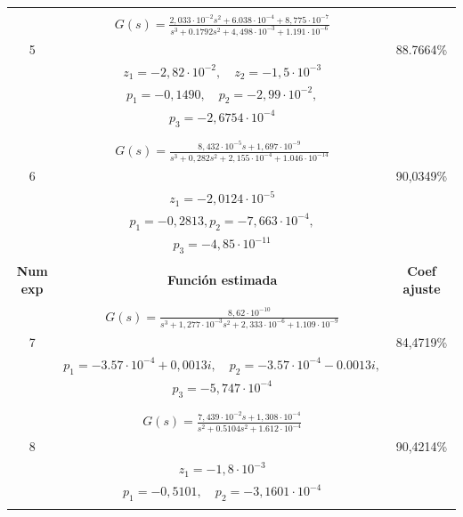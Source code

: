 \begin{longtable}{| c | c | c |}
\hline
     &  &   \\
     &  \Large$ G(s) = \frac{2,033 \cdot 10^{-2}s^{2}+ 6.038 \cdot 10^{-4} + 8,775 \cdot 10^{-7}}{ s^{3} + 0.1792s^{2} + 4,498\cdot 10^{-3} + 1.191 \cdot 10^{-6}} $ &  \\
  5 &  & 88.7664\%  \\
     &  $ z_{1} = -2,82 \cdot 10^{-2},\quad z_{2} = -1,5 \cdot 10^{-3} $ &   \\
     &  $ p_{1} = -0,1490,\quad p_{2} = -2,99 \cdot 10^{-2}, $ &  \\
     &  $ p_{3} = -2,6754 \cdot 10^{-4} $ & \\
     &  &   \\
\hline
     &  &   \\
     &  \Large$ G(s) = \frac{8,432 \cdot 10^{-5}s + 1,697 \cdot 10^{-9}}{ s^{3} + 0,282s^{2} + 2,155\cdot 10^{-4} + 1.046 \cdot 10^{-14}} $ &  \\
  6 &  & 90,0349\%  \\
     &  $ z_{1} = -2,0124 \cdot 10^{-5}$ &   \\
     &  $ p_{1} = -0,2813,  p_{2} = -7,663\cdot 10^{-4}, $ &  \\
     &  $ p_{3} = -4,85 \cdot 10^{-11} $ & \\
     &  &   \\
\hline
\newpage
\hline
\textbf{Num exp} & \textbf{Función estimada} & \textbf{Coef ajuste} \\
\hline
     &  &   \\
     &  \large$ G(s) = \frac{8,62\cdot 10^{-10}}{ s^{3} + 1,277 \cdot 10^{-3}s^{2} + 2,333\cdot 10^{-6} + 1.109 \cdot 10^{-9}} $ & \\
  7 &  & 84,4719\%  \\
     &  $ p_{1} = - 3.57\cdot 10^{-4} + 0,0013i,\quad p_{2} = -3.57\cdot 10^{-4}  - 0.0013i, $ &  \\
     &  $ p_{3}=- 5,747 \cdot 10^{-4} $ &   \\
     &  & \\
\hline
     &  &   \\
     &  \large$ G(s) = \frac{7,439 \cdot 10^{-2}s + 1,308 \cdot 10^{-4}}{ s^{2} + 0.5104s^{2} + 1.612\cdot 10^{-4}} $ &  \\
  8 &  & 90,4214\%  \\
     &  $ z_{1} = -1,8 \cdot 10^{-3}$ &   \\
     &  $ p_{1} = -0,5101,\quad p_{2} = -3,1601 \cdot 10^{-4}$ &  \\
     &  &   \\

\end{longtable}
